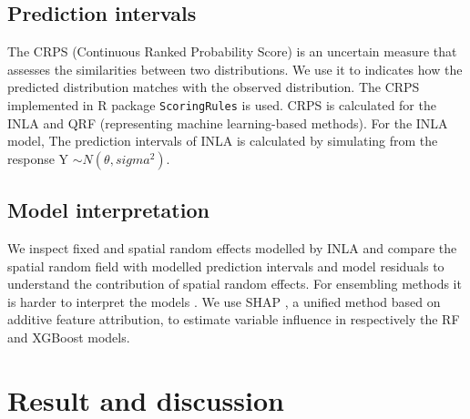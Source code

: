 \documentclass{article}
\begin{document}
\subsection {Prediction intervals}
The CRPS (Continuous Ranked Probability Score) is an uncertain measure that assesses the similarities between two distributions. We use it to indicates how the predicted distribution matches with the observed distribution. The CRPS implemented in R package {\tt ScoringRules} \citep{jordan2017evaluating} is used. CRPS is calculated for the INLA and QRF (representing machine learning-based methods). For the INLA model, The prediction intervals of INLA is calculated by simulating from the response Y $\sim N(\theta, sigma^2)$. 
 
 


 
\subsection{Model interpretation}
We inspect fixed and spatial random effects modelled by INLA and compare the spatial random field with modelled prediction intervals and model residuals to understand the contribution of spatial random effects. For ensembling methods it is harder to interpret the models \citep{NIPS2017_8a20a862}. We use SHAP \citep[SHapley Additive exPlanations,][]{lundberg2018explainable,NIPS2017_8a20a862}, a unified method based on additive feature attribution, to estimate variable influence in respectively the RF and XGBoost models.   





\section{Result and discussion}
\end{document}
